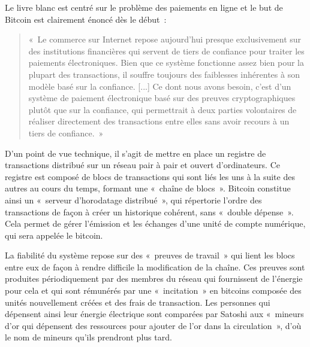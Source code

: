 Le livre blanc est centré sur le problème des paiements en ligne et le but de Bitcoin est clairement énoncé dès le début~:

\begin{quote}
«~Le commerce sur Internet repose aujourd'hui presque exclusivement sur des institutions financières qui servent de tiers de confiance pour traiter les paiements électroniques. Bien que ce système fonctionne assez bien pour la plupart des transactions, il souffre toujours des faiblesses inhérentes à son modèle basé sur la confiance. [...] Ce dont nous avons besoin, c'est d'un système de paiement électronique basé sur des preuves cryptographiques plutôt que sur la confiance, qui permettrait à deux parties volontaires de réaliser directement des transactions entre elles sans avoir recours à un tiers de confiance.~»
\end{quote}


D'un point de vue technique, il s'agit de mettre en place un registre de transactions distribué sur un réseau pair à pair et ouvert d'ordinateurs. Ce registre est composé de blocs de transactions qui sont liés les uns à la suite des autres au cours du temps, formant une «~chaîne de blocs~». Bitcoin constitue ainsi un «~serveur d'horodatage distribué~», qui répertorie l'ordre des transactions de façon à créer un historique cohérent, sans «~double dépense~». Cela permet de gérer l'émission et les échanges d'une unité de compte numérique, qui sera appelée le bitcoin.

La fiabilité du système repose sur des «~preuves de travail~» qui lient les blocs entre eux de façon à rendre difficile la modification de la chaîne. Ces preuves sont produites périodiquement par des membres du réseau qui fournissent de l'énergie pour cela et qui sont rémunérés par une «~incitation~» en bitcoins composée des unités nouvellement créées et des frais de transaction. Les personnes qui dépensent ainsi leur énergie électrique sont comparées par Satoshi aux «~mineurs d'or qui dépensent des ressources pour ajouter de l'or dans la circulation~», d'où le nom de mineurs qu'ils prendront plus tard.

